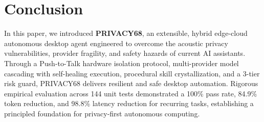 \documentclass[conference]{IEEEtran}
\begin{document}
\section{Conclusion}
\label{sec:conclusion}
In this paper, we introduced \textbf{PRIVACY68}, an extensible, hybrid edge-cloud autonomous desktop agent engineered to overcome the acoustic privacy vulnerabilities, provider fragility, and safety hazards of current AI assistants. Through a Push-to-Talk hardware isolation protocol, multi-provider model cascading with self-healing execution, procedural skill crystallization, and a 3-tier risk guard, PRIVACY68 delivers resilient and safe desktop automation. Rigorous empirical evaluation across 144 unit tests demonstrated a 100\% pass rate, 84.9\% token reduction, and 98.8\% latency reduction for recurring tasks, establishing a principled foundation for privacy-first autonomous computing.



\end{document}
